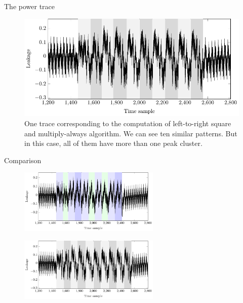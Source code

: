 \begin{frame}{The power trace}
    \begin{figure}[htb]
    \centering
    \includegraphics{fig/SPA_on_RSA_countermeasure}
    \caption{One trace corresponding to the computation of left-to-right square and multiply-always algorithm.
    We can see ten similar patterns.
    But in this case, all of them have more than one peak cluster.}
\end{figure}
\end{frame}

\begin{frame}{Comparison}
\begin{figure}[H]
    \centering
    \includegraphics[width=0.6\textwidth]{fig/SPA_on_RSA_highlighted_peaks.pdf}
\end{figure}
    \begin{figure}[H]
    \centering
    \includegraphics[width=0.6\textwidth]{fig/SPA_on_RSA_countermeasure}
\end{figure}
\end{frame}